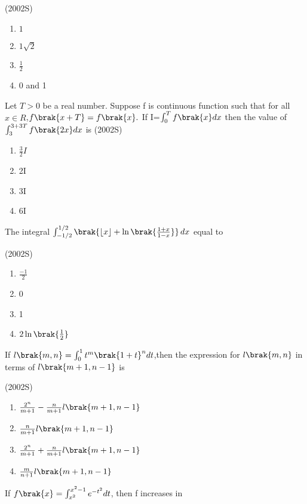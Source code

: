 	\hfill(2002S)
\begin{enumerate}
  \item ${1}$
  \item ${1}{\sqrt2}$
  \item $\frac{1}{2}$
   \item 0 and 1
   \end{enumerate}
   \item Let $T>0$ be a real number. Suppose f is continuous function such that for all ${x}\in{R}$,$f\brak{x+T}=f\brak{x}.$
   If I=$\int_{0}^{T}f\brak{x}dx$ then the value of $\int_{3}^{3+3T} f\brak{2x} dx $ is
		\hfill(2002S)
\begin{enumerate}
	\item $\frac{3}{2}{I}$
   \item 2I
   \item 3I
   \item 6I
   \end{enumerate}
   \item The integral $\int_{-1/2}^{1/2} \brak{ \lfloor x \rfloor + \ln \brak{ \frac{1+x}{1-x} } } \, dx$ equal to
   
	   \hfill(2002S)
\begin{enumerate}[label=(\alph*)]
	\item $\frac{-1}{2}$
 \item 0
 \item 1
 \item $2\ln\brak{\frac{1}{2}}$
 \end{enumerate}



   \item If $l\brak{m,n}=\int_{0}^{1} t^{m}\brak{1+t}^{n} dt$,then the expression for $l\brak{m,n}$ in terms of $l\brak{m+1,n-1}$ is
   
	   \hfill(2002S)
\begin{enumerate}
 \item $\frac{2^{n}}{m+1} -\frac{n}{m+1}l\brak{m+1,n-1}$
 \item $\frac{n}{m+1}l\brak{m+1,n-1}$
 \item$ \frac{2^{n}}{m+1}+\frac{n}{m+1}l\brak{m+1,n-1}$
 \item $\frac{m}{n+1}l\brak{m+1,n-1}$
\end{enumerate}
\item If $f\brak{x}=\int_{x^{2}}^{x^{2}-1} e^{-t^{2}}dt$, then f increases in

